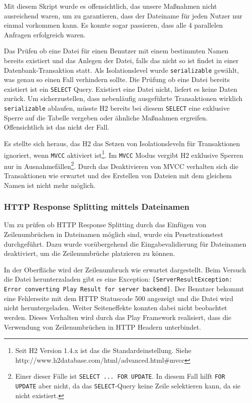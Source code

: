 \documentclass[12pt,DIV14,BCOR10mm,a4paper,parskip=half-,headsepline,headinclude,english,ngerman,bibliography=totocnumbered]{scrreprt}
\begin{document}
Mit diesem Skript wurde es offensichtlich, das unsere Maßnahmen nicht ausreichend waren, um zu garantieren, dass der Dateiname für jeden Nutzer nur einmal vorkommen kann. Es konnte sogar passieren, dass alle 4 parallelen Anfragen erfolgreich waren.

Das Prüfen ob eine Datei für einen Benutzer mit einem bestimmten Namen bereits existiert und das Anlegen der Datei, falls das nicht so ist findet in einer Datenbank-Transaktion statt. Als Isolationslevel wurde \texttt{serializable} gewählt, was genau so einen Fall verhindern sollte. Die Prüfung ob eine Datei bereits existiert ist ein \texttt{SELECT} Query. Existiert eine Datei nicht, liefert es keine Daten zurück. Um sicherzustellen, dass nebenläufig ausgeführte Transaktionen wirklich \texttt{serializable} ablaufen, müsste H2 bereits bei diesem \texttt{SELECT} eine exklusive Sperre auf die Tabelle vergeben oder ähnliche Maßnahmen ergreifen. Offensichtlich ist das nicht der Fall.

Es stellte sich heraus, das H2 das Setzen von Isolationsleveln für Transaktionen ignoriert, wenn \texttt{MVCC} aktiviert ist\footnote{Seit H2 Version 1.4.x ist das die Standardeinstellung. Siehe http://www.h2database.com/html/advanced.html\#mvcc}. Im \texttt{MVCC} Modus vergibt H2 exklusive Sperren nur in Ausnahmefällen\footnote{Einer dieser Fälle ist \texttt{SELECT ... FOR UPDATE}. In diesem Fall hilft \texttt{FOR UPDATE} aber nicht, da das \texttt{SELECT}-Query keine Zeile selektieren kann, da sie nicht existiert.}. Durch das Deaktivieren von MVCC verhalten sich die Transaktionen wie erwartet und des Erstellen von Dateien mit dem gleichem Namen ist nicht mehr möglich.


\subsubsection{HTTP Response Splitting mittels Dateinamen}
Um zu prüfen ob HTTP Response Splitting durch das Einfügen von Zeilenumbrüchen in Dateinamen möglich sind, wurde ein Penetrationstest durchgeführt. Dazu wurde vorübergehend die Eingabevalidierung für Dateinamen deaktiviert, um die Zeilenumbrüche platzieren zu können.

In der Oberfläche wird der Zeilenumbruch wie erwartet dargestellt. Beim Versuch die Datei herunterzaladen gibt es eine Exception: \texttt{[ServerResultException: Error converting Play Result for server backend]}. Der Benutzer bekommt eine Fehlerseite mit dem HTTP Statuscode 500 angezeigt und die Datei wird nicht heruntergeladen. Weiter Seiteneffekte konnten dabei nicht beobachtet werden. Dieses Verhalten wird durch das Play Framework realisiert, dass die Verwendung von Zeilenumbrüchen in HTTP Headern unterbindet.
\end{document}
